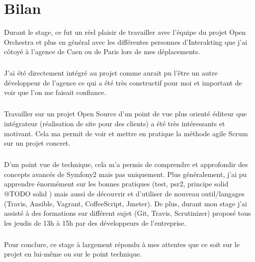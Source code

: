 \chapter*{Bilan}
Durant le stage, ce fut un réel plaisir de travailler avec l'équipe du projet Open Orchestra et plus en général avec les différentes personnes d'Interakting que j'ai côtoyé à l'agence de Caen ou de Paris lors de mes déplacements.
\paragraph{}
J'ai été directement intégré au projet comme aurait pu l'être un autre développeur de l'agence ce qui a été très constructif pour moi et important de voir que l'on me faisait confiance.
\paragraph{}
Travailler sur un projet Open Source d'un point de vue plus orienté éditeur que intégrateur (réalisation de site pour des clients) a été très intéressants et motivant.  Cela ma permit de voir et mettre en pratique la méthode agile Scrum sur un projet concret.
\paragraph{}
D'un point vue de technique, cela m'a permis de comprendre et approfondir des concepts avancés de  Symfony2  mais pas uniquement. Plus généralement, j'ai pu apprendre énormément sur les bonnes pratiques (test, psr2, principe solid @TODO solid
) mais aussi de découvrir et d'utiliser de nouveau outil/langages (Travis, Ansible, Vagrant, CoffeeScript, Jmeter). 
De plus, durant mon stage j'ai assisté à des formations sur différent sujet (Git, Travis, Scrutinizer) proposé tous les jeudis de 13h à 15h par des développeurs de l'entreprise.
\paragraph{}
Pour conclure, ce stage à largement répondu à mes attentes que ce soit sur le projet en lui-même ou sur le point technique.